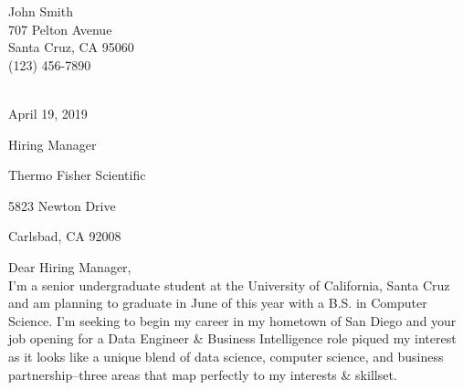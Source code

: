 \documentclass[11pt]{article}
\begin{document}
\begin{center}
    John Smith \\
    707 Pelton Avenue \\
    Santa Cruz, CA 95060 \\
    (123) 456-7890 \\
\end{center} \\

April 19, 2019 \\

\vspace{.3em}

Hiring Manager 

Thermo Fisher Scientific 

5823 Newton Drive 

Carlsbad, CA 92008 \\

\vspace{.3em}

Dear Hiring Manager, \\

I'm a senior undergraduate student at the University of California, Santa Cruz and am planning to graduate in June of this year with a B.S. in Computer Science. I'm seeking to begin my career in my hometown of San Diego and your job opening for a Data Engineer \& Business Intelligence role piqued my interest as it looks like a unique blend of data science, computer science, and business partnership--three areas that map perfectly to my interests \& skillset.\\
\end{document}
